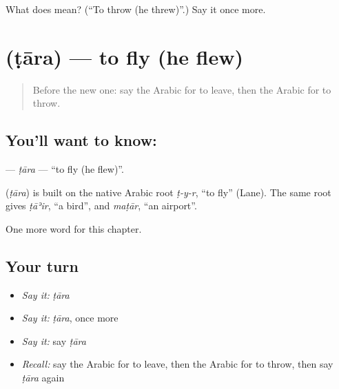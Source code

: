 \begin{tcolorbox}[breakable,colback=teal!4,colframe=teal!35!black,title={Before you move on}]
What does  mean? (\textquotedblleft{}To throw (he threw)\textquotedblright{}.) Say it once more.
\end{tcolorbox}
\section[\texorpdfstring{\ar{طار} (ṭāra)}{طار (ṭāra)}]{ (ṭāra) — to fly (he flew)}

\label{lesson:AR-C63-tara}



\begin{quote}
Before the new one: say the Arabic for to leave, then the Arabic for to throw.
\end{quote}

\subsection*{You'll want to know: }
\textbf{} — \emph{ṭāra} — \textquotedblleft{}to fly (he flew)\textquotedblright{}.

\begin{cousinweb}
\textbf{} (\emph{ṭāra}) is built on the native Arabic root \emph{ṭ-y-r}, \textquotedblleft{}to fly\textquotedblright{} (Lane). The same root gives \emph{ṭāʾir}, \textquotedblleft{}a bird\textquotedblright{}, and \emph{maṭār}, \textquotedblleft{}an airport\textquotedblright{}.
\end{cousinweb}

\begin{grammarlens}[title={What you've built}]
One more word for this chapter.
\end{grammarlens}

\subsection*{Your turn}
\begin{itemize}
\raggedright
  \item \emph{Say it:} \emph{ṭāra}
  \item \emph{Say it:} \emph{ṭāra}, once more
  \item \emph{Say it:} say \emph{ṭāra}
  \item \emph{Recall:} say the Arabic for to leave, then the Arabic for to throw, then say \emph{ṭāra} again
\end{itemize}

